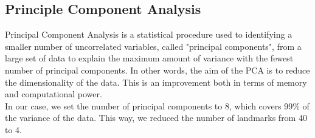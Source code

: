 \documentclass[a4paper]{article}
\begin{document}
\subsection{Principle Component Analysis}

Principal Component Analysis is a statistical procedure used to identifying a smaller number of uncorrelated variables, called "principal components", from a large set of data to explain the maximum amount of variance with the fewest number of principal components. In other words, the aim of the PCA is to reduce the dimensionality of the data. This is an improvement both in terms of memory and computational power.\\
In our case, we set the number of principal components to 8, which covers 99\% of the variance of the data. This way, we reduced the number of landmarks from 40 to 4.
\end{document}
